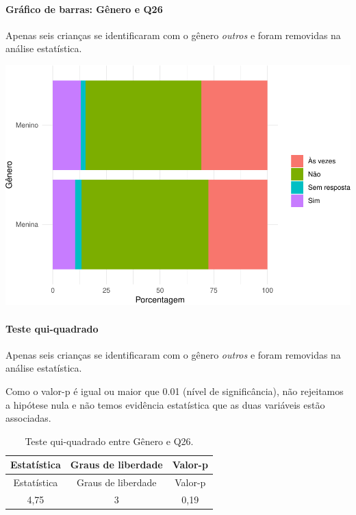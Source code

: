 \documentclass[]{article}
\let\oldparagraph\paragraph
\renewcommand{\paragraph}[1]{\oldparagraph{#1}\mbox{}}
\begin{document}
\hypertarget{gruxe1fico-de-barras-guxeanero-e-q26}{%
\paragraph{Gráfico de barras: Gênero e Q26}\label{gruxe1fico-de-barras-guxeanero-e-q26}}

Apenas seis crianças se identificaram com o gênero \emph{outros} e foram removidas na análise estatística.

\begin{center}\includegraphics[width=0.75\linewidth]{relatorio_covid19_files/figure-latex/unnamed-chunk-732-1} \end{center}

\hypertarget{teste-qui-quadrado-63}{%
\paragraph{Teste qui-quadrado}\label{teste-qui-quadrado-63}}

Apenas seis crianças se identificaram com o gênero \emph{outros} e foram removidas na análise estatística.

Como o valor-p é igual ou maior que 0.01 (nível de significância), não rejeitamos a hipótese nula e não temos evidência estatística que as duas variáveis estão associadas.

\begin{longtable}[]{@{}ccc@{}}
\caption{\label{tab:unnamed-chunk-734}Teste qui-quadrado entre Gênero e Q26.}\tabularnewline
\toprule
Estatística & Graus de liberdade & Valor-p\tabularnewline
\midrule
\endfirsthead
\toprule
Estatística & Graus de liberdade & Valor-p\tabularnewline
\midrule
\endhead
4,75 & 3 & 0,19\tabularnewline
\bottomrule
\end{longtable}

\cleardoublepage
\end{document}
